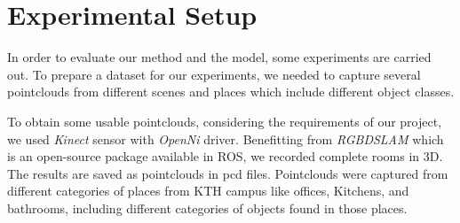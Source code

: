 % 
% 
%  
% 
% 
% 
% 
% 


\section{Experimental Setup}
\label{ExperimentalSetup.sec}
In order to evaluate our method and the model, some experiments are carried out.
To prepare a dataset for our experiments, we needed to capture several pointclouds from different scenes and places which 
include different object classes.



To obtain some usable pointclouds, considering the requirements of our project, we used {\it Kinect} sensor with {\it OpenNi} driver. Benefitting from {\it RGBDSLAM} \cite{RGBDSLAM} which is an open-source package available in ROS, we recorded complete rooms in 3D.  
The results are saved as pointclouds in pcd files.
Pointclouds were captured from different categories of places from KTH campus like offices, Kitchens, and bathrooms, including different categories of objects found in those places.

